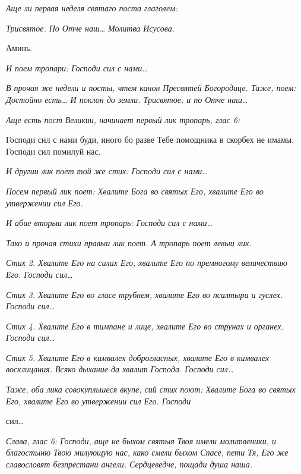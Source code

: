  \itshape Аще ли первая неделя святаго поста глаголем:\normalfont{}


 \itshape Трисвятое\normalfont{}. \itshape По\normalfont{} Отче наш… \itshape Молитва Исусова\normalfont{}.


   Аминь.


 \itshape И поем тропари:\normalfont{} Господи сил с нами…


 \itshape В прочая же недели и посты, чтем канон Пресвятей Богородице.
Таже, поем:\normalfont{} Достойно есть… \itshape И поклон до земли.\normalfont{} \itshape Трисвятое\normalfont{}, \itshape и по\normalfont{} Отче
наш…


 \itshape Аще есть пост Великии, начинает первый лик тропарь, глас 6:\normalfont{}


   Господи сил с нами буди, иного бо разве Тебе помощника в скорбех не
имамы, Господи сил помилуй нас.


 \itshape И другии лик поет той же стих:\normalfont{} Господи сил с нами…


 \itshape Посем первый лик поет:\normalfont{} Хвалите Бога во святых Его, хвалите Его во
утвержении сил Его.


 \itshape И абие вторыи лик поет тропарь:\normalfont{} Господи сил с нами…


 \itshape Тако и прочая стихи правыи лик поет. А тропарь поет левыи
лик.\normalfont{}


 \itshape Стих 2.\normalfont{} Хвалите Его на силах Его, хвалите Его по премногому
величествию Его. Господи сил…


 \itshape Стих 3.\normalfont{} Хвалите Его во гласе трубнем, хвалите Его во псалтыри и гуслех.
Господи сил…


 \itshape Стих 4.\normalfont{} Хвалите Его в тимпане и лице, хвалите Его во струнах и органех.
Господи сил…


 \itshape Стих 5.\normalfont{} Хвалите Его в кимвалех доброгласных, хвалите Его в
кимвалех восклицания. Всяко дыхание да хвалит Господа. Господи
сил…


 \itshape Таже, оба лика совокупльшеся вкупе, сий стих поют:\normalfont{} Хвалите
Бога во святых Его, хвалите Его во утвержении сил Его. Господи

сил…


 \itshape Слава, глас 6:\normalfont{} Господи, аще не быхом святыя Твоя имели молитвеники, и
благостыню Твою милующую нас, како смели быхом Спасе, пети Тя,
Его же славословят безпрестани ангели. Сердцеведче, пощади душа
наша.


